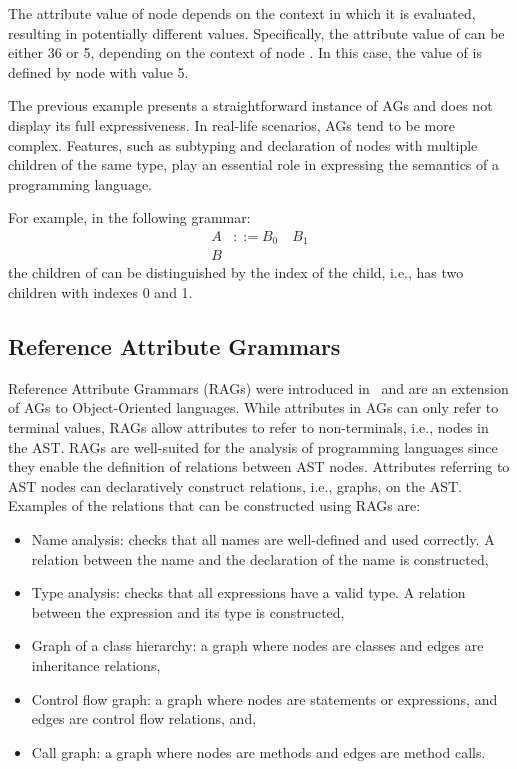 The attribute value of node  depends on the context in which it is
evaluated, resulting in potentially different values. Specifically, the attribute
value of   can be either 36 or 5, depending on the context of node .
In this case, the value of 
is defined by node  with value 5.



The previous example presents a straightforward instance of AGs
and does not display its full expressiveness. In real-life scenarios, AGs
tend to be more complex. Features, such as subtyping and declaration of nodes with multiple
children of the same type, play an essential role in expressing the semantics of
a programming language.

For example, in the following grammar:
    \begin{align*}
        A& ::= B_0 \quad B_1 \\
        B&
    \end{align*}
the children of  can be distinguished by the index of the child, i.e.,  has two children
 with indexes 0 and 1.


\subsection{Reference Attribute Grammars}%
\label{sec:rag}
Reference Attribute Grammars (RAGs) were introduced in~\cite{DBLP:journals/informaticaSI/Hedin00}
and are an extension of AGs to Object-Oriented languages. While attributes in AGs
can only refer to terminal values, RAGs allow attributes to refer to non-terminals, i.e., nodes in the AST.
RAGs are well-suited for the analysis of programming languages since they enable
the definition of relations between AST nodes. Attributes referring
to AST nodes can declaratively construct relations, i.e., graphs, on the AST.
Examples of the relations that can be constructed using RAGs are:
\begin{itemize}
    \item Name analysis: checks that all names are well-defined and used correctly. A relation between
    the name and the declaration of the name is constructed,
    \item Type analysis: checks that all expressions have a valid type. A relation between the expression
    and its type is constructed,
    \item Graph of a class hierarchy: a graph where nodes are classes and edges are inheritance relations,
    \item Control flow graph: a graph where nodes are statements or expressions, and edges are control flow relations, and,
    \item Call graph: a graph where nodes are methods and edges are method calls.
\end{itemize}



